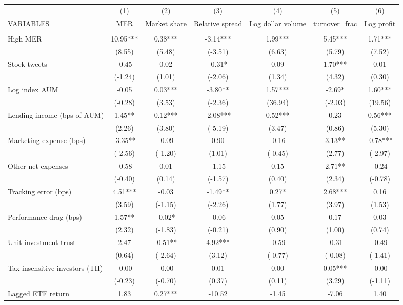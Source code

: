 \documentclass[]{article}
\begin{document}
\begin{tabular}{lcccccc} \hline
 & (1) & (2) & (3) & (4) & (5) & (6) \\
VARIABLES & MER & Market share & Relative spread & Log dollar volume & turnover\_frac & Log profit \\ \hline
 &  &  &  &  &  &  \\
High MER & 10.95*** & 0.38*** & -3.14*** & 1.99*** & 5.45*** & 1.71*** \\
 & (8.55) & (5.48) & (-3.51) & (6.63) & (5.79) & (7.52) \\
Stock tweets & -0.45 & 0.02 & -0.31* & 0.09 & 1.70*** & 0.01 \\
 & (-1.24) & (1.01) & (-2.06) & (1.34) & (4.32) & (0.30) \\
Log index AUM & -0.05 & 0.03*** & -3.80** & 1.57*** & -2.69* & 1.60*** \\
 & (-0.28) & (3.53) & (-2.36) & (36.94) & (-2.03) & (19.56) \\
Lending income (bps of AUM) & 1.45** & 0.12*** & -2.08*** & 0.52*** & 0.23 & 0.56*** \\
 & (2.26) & (3.80) & (-5.19) & (3.47) & (0.86) & (5.30) \\
Marketing expense (bps) & -3.35** & -0.09 & 0.90 & -0.16 & 3.13** & -0.78*** \\
 & (-2.56) & (-1.20) & (1.01) & (-0.45) & (2.77) & (-2.97) \\
Other net expenses & -0.58 & 0.01 & -1.15 & 0.15 & 2.71** & -0.24 \\
 & (-0.40) & (0.14) & (-1.57) & (0.40) & (2.34) & (-0.78) \\
Tracking error (bps) & 4.51*** & -0.03 & -1.49** & 0.27* & 2.68*** & 0.16 \\
 & (3.59) & (-1.15) & (-2.26) & (1.77) & (3.97) & (1.53) \\
Performance drag (bps) & 1.57** & -0.02* & -0.06 & 0.05 & 0.17 & 0.03 \\
 & (2.32) & (-1.83) & (-0.21) & (0.90) & (1.00) & (0.74) \\
Unit investment trust & 2.47 & -0.51** & 4.92*** & -0.59 & -0.31 & -0.49 \\
 & (0.64) & (-2.64) & (3.12) & (-0.77) & (-0.08) & (-1.41) \\
Tax-insensitive investors (TII) & -0.00 & -0.00 & 0.01 & 0.00 & 0.05*** & -0.00 \\
 & (-0.23) & (-0.70) & (0.37) & (0.11) & (3.29) & (-1.11) \\
Lagged ETF return & 1.83 & 0.27*** & -10.52 & -1.45 & -7.06 & 1.40 \\

\end{tabular}
\end{document}
